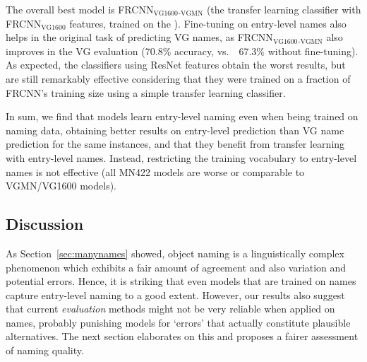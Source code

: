 The overall best model is FRCNN$_\text{VG1600}$$_\text{-VGMN}$ (the transfer learning classifier with FRCNN$_\text{VG1600}$ features, trained on the \mn).
Fine-tuning on entry-level names also helps in the original task of predicting VG names, as FRCNN$_\text{VG1600}$$_\text{-VGMN}$ also improves in the VG evaluation (70.8\% accuracy, vs.\ \ 67.3\% without fine-tuning).
As expected, the classifiers using ResNet features obtain the worst results, but are still remarkably effective considering that they were trained on a fraction of FRCNN's training size using a simple transfer learning classifier.

In sum, we find that models learn entry-level naming even when being trained on \arbitrary naming data, obtaining better results on entry-level prediction than VG name prediction for the same instances, and that they benefit from transfer learning with entry-level names. Instead, restricting the training vocabulary to entry-level names is not effective (all MN422 models are worse or comparable to VGMN/VG1600 models).


\subsection{Discussion}
\label{sect:exp_discussion}

As Section~\ref{sec:manynames} showed, object naming is a linguistically complex phenomenon which exhibits a fair amount of agreement and also variation and potential errors.
Hence, it is striking that even models that are trained on \arbitrary names capture entry-level naming to a good extent.
However, our results also suggest that current \textit{evaluation} methods might not be very reliable when applied on \arbitrary names, probably punishing models for `errors' that actually constitute plausible alternatives.
The next section elaborates on this and proposes a fairer assessment of naming quality.

